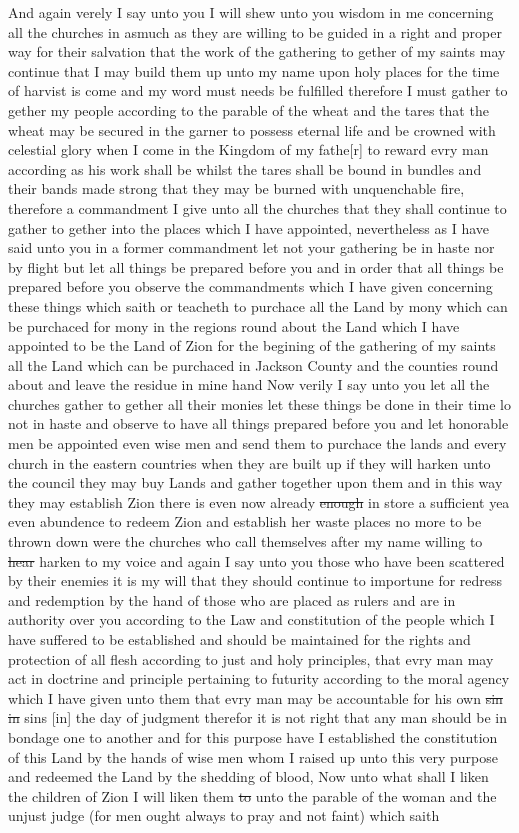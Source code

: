				And again verely I say unto you I will shew unto you wisdom in me concerning all the churches in asmuch as they are willing to be guided in a right and proper way for their salvation that the work of the gathering to gether of my saints may continue that I may build them up unto my name upon holy places for the time of harvist is come and my word must needs be fulfilled therefore I must gather to gether my people according to the parable of the wheat and the tares that the wheat may be secured in the garner to possess eternal life and be crowned with celestial glory when I come in the Kingdom of my fathe[r] to reward evry man according as his work shall be whilst the tares shall be bound in bundles and their bands made strong that they may be burned with unquenchable fire, therefore a commandment I give unto all the churches that they shall continue to gather to gether into the places which I have appointed, nevertheless as I have said unto you in a former commandment let not your gathering be in haste nor by flight but let all things be prepared before you and in order that all things be prepared before you observe the commandments which I have given concerning these things which saith or teacheth to purchace all the Land by mony which can be purchaced for mony in the regions round about the Land which I have appointed to be the Land of Zion for the begining of the gathering of my saints all the Land which can be purchaced in Jackson County and the counties round about and leave the residue in mine hand Now verily I say unto you let all the churches gather to gether all their monies let these things be done in their time lo not in haste and observe to have all things prepared before you and let honorable men be appointed even wise men and send them to purchace the lands and every church in the eastern countries when they are built up if they will harken unto the council they may buy Lands and gather together upon them and in this way they may establish Zion there is even now already \sout{enough} in store a sufficient yea even abundence to redeem Zion and establish her waste places no more to be thrown down were the churches who call themselves after my name willing to \sout{hear} harken to my voice and again I say unto you those who have been scattered by their enemies it is my will that they should continue to importune for redress and redemption by the hand of those who are placed as rulers and are in authority over you according to the Law and constitution of the people which I have suffered to be established and should be maintained for the rights and protection of all flesh according to just and holy principles, that evry man may act in doctrine and principle pertaining to futurity according to the moral agency which I have given unto them that evry man may be accountable for his own \sout{sin in} sins [in] the day of judgment therefor it is not right that any man should be in bondage one to another and for this purpose have I established the constitution of this Land by the hands of wise men whom I raised up unto this very purpose and redeemed the Land by the shedding of blood, Now unto what shall I liken the children of Zion I will liken them \sout{to} unto the parable of the woman and the unjust judge (for men ought always to pray and not faint) which saith 